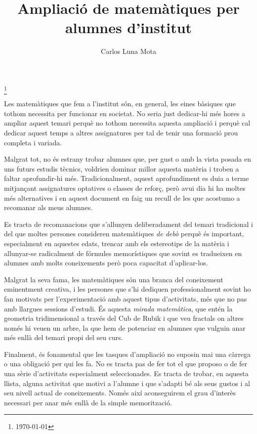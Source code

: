 \documentclass[a4paper, 12pt]{article}
\title{Ampliació de matemàtiques per alumnes d'institut}
\date{}
\author{Carlos Luna Mota}
\newcommand\blfootnote[1]{%
  \begingroup
  \renewcommand\thefootnote{}\footnote{#1}%
  \addtocounter{footnote}{-1}%
  \endgroup
}
\begin{document}
    \maketitle

    \blfootnote{\raisebox{0.2ex}{\ccbyncsa} \today}Les matemàtiques que fem a l'institut són, en general, les eines bàsiques que tothom necessita per funcionar en societat. No seria just dedicar-hi més hores a ampliar aquest temari perquè no tothom necessita aquesta ampliació i perquè cal dedicar aquest temps a altres assignatures per tal de tenir una formació prou completa i variada.

    Malgrat tot, no és estrany trobar alumnes que, per gust o amb la vista posada en uns futurs estudis tècnics, voldrien dominar millor aquesta matèria i troben a faltar aprofundir-hi més. Tradicionalment, aquest aprofundiment es duia a terme mitjançant assignatures optatives o classes de reforç, però avui dia hi ha moltes més alternatives i en aquest document en faig un recull de les que acostumo a recomanar als meus alumnes.

    Es tracta de recomanacions que s'allunyen deliberadament del temari tradicional i del que moltes persones consideren matemàtiques \emph{de debò} perquè és important, especialment en aquestes edats, trencar amb els estereotips de la matèria i allunyar-se radicalment de fórmules memorístiques que sovint es tradueixen en alumnes amb molts coneixements però poca capacitat d'aplicar-los.

    Malgrat la seva fama, les matemàtiques són una branca del coneixement eminentment creativa, i les persones que s'hi dediquen professionalment sovint ho fan motivats per l'experimentació amb aquest tipus d'activitats, més que no pas amb llargues sessions d'estudi. És aquesta \emph{mirada matemàtica}, que entén la geometria tridimensional a través del Cub de Rubik i que veu fractals on altres només hi veuen un arbre, la que hem de potenciar en alumnes que vulguin anar més enllà del temari propi del seu curs.

    Finalment, és fonamental que les tasques d'ampliació no suposin mai una càrrega o una obligació per qui les fa. No es tracta pas de fer tot el que proposo o de fer una sèrie d'activitats especialment seleccionades. Es tracta de trobar, en aquesta llista, alguna activitat que motivi a l'alumne i que s'adapti bé als seus gustos i al seu nivell actual de coneixements. Només així aconseguirem el grau d'interès necessari per anar més enllà de la simple memorització.
\end{document}
